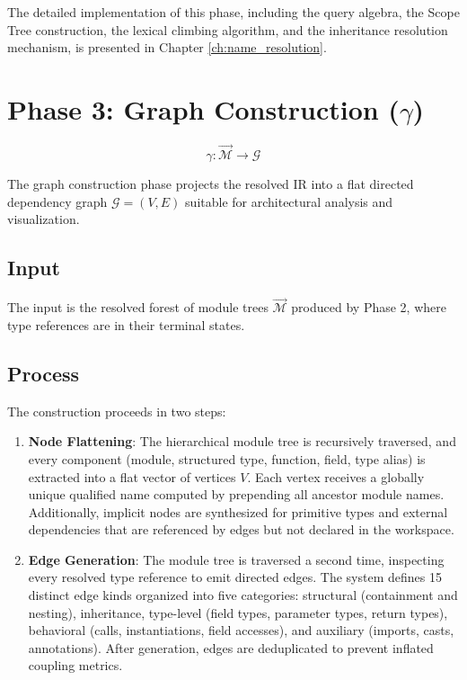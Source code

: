 The detailed implementation of this phase, including the query
algebra, the Scope Tree construction, the lexical climbing algorithm,
and the inheritance resolution mechanism, is presented in Chapter
\ref{ch:name_resolution}.

\section{Phase 3: Graph Construction ($\gamma$)}
\label{sec:phase3_overview}

$$\gamma : \vec{\mathcal{M}} \to \mathcal{G}$$

The graph construction phase projects the resolved IR into a flat
directed dependency graph $\mathcal{G} = (V, E)$ suitable for
architectural analysis and visualization.

\subsection{Input}

The input is the resolved forest of module trees $\vec{\mathcal{M}}$
produced by Phase 2, where type references are in their terminal states.

\subsection{Process}

The construction proceeds in two steps:

\begin{enumerate}
  \item \textbf{Node Flattening}: The hierarchical module tree is
    recursively traversed, and every component (module, structured
    type, function, field, type alias) is extracted into a flat
    vector of vertices $V$. Each vertex receives a globally unique
    qualified name computed by prepending all ancestor module names.
    Additionally, implicit nodes are synthesized for primitive types
    and external dependencies that are referenced by edges but not
    declared in the workspace.
  \item \textbf{Edge Generation}: The module tree is traversed a
    second time, inspecting every resolved type reference to emit
    directed edges. The system defines 15 distinct edge kinds
    organized into five categories: structural (containment and
    nesting), inheritance, type-level (field types, parameter types,
    return types), behavioral (calls, instantiations, field
    accesses), and auxiliary (imports, casts, annotations). After
    generation, edges are deduplicated to prevent inflated coupling metrics.
\end{enumerate}

